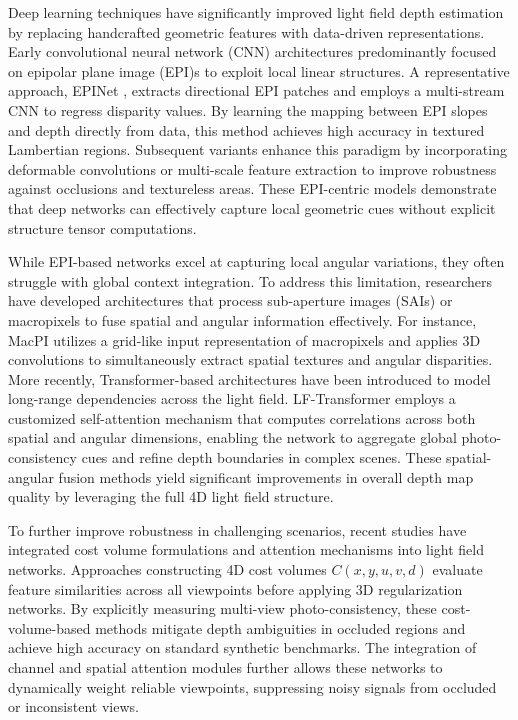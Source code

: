 \documentclass[lettersize,journal]{IEEEtran}
\begin{document}
Deep learning techniques have significantly improved light field depth estimation by replacing handcrafted geometric features with data-driven representations. Early convolutional neural network (CNN) architectures predominantly focused on epipolar plane image (EPI)s to exploit local linear structures. A representative approach, EPINet \cite{he2016}, extracts directional EPI patches and employs a multi-stream CNN to regress disparity values. By learning the mapping between EPI slopes and depth directly from data, this method achieves high accuracy in textured Lambertian regions. Subsequent variants enhance this paradigm by incorporating deformable convolutions or multi-scale feature extraction to improve robustness against occlusions and textureless areas. These EPI-centric models demonstrate that deep networks can effectively capture local geometric cues without explicit structure tensor computations.

While EPI-based networks excel at capturing local angular variations, they often struggle with global context integration. To address this limitation, researchers have developed architectures that process sub-aperture images (SAIs) or macropixels to fuse spatial and angular information effectively. For instance, MacPI utilizes a grid-like input representation of macropixels and applies 3D convolutions to simultaneously extract spatial textures and angular disparities. More recently, Transformer-based architectures have been introduced to model long-range dependencies across the light field. LF-Transformer employs a customized self-attention mechanism that computes correlations across both spatial and angular dimensions, enabling the network to aggregate global photo-consistency cues and refine depth boundaries in complex scenes. These spatial-angular fusion methods yield significant improvements in overall depth map quality by leveraging the full 4D light field structure.

To further improve robustness in challenging scenarios, recent studies have integrated cost volume formulations and attention mechanisms into light field networks. Approaches constructing 4D cost volumes $C(x, y, u, v, d)$ evaluate feature similarities across all viewpoints before applying 3D regularization networks. By explicitly measuring multi-view photo-consistency, these cost-volume-based methods mitigate depth ambiguities in occluded regions and achieve high accuracy on standard synthetic benchmarks. The integration of channel and spatial attention modules further allows these networks to dynamically weight reliable viewpoints, suppressing noisy signals from occluded or inconsistent views.
\end{document}
